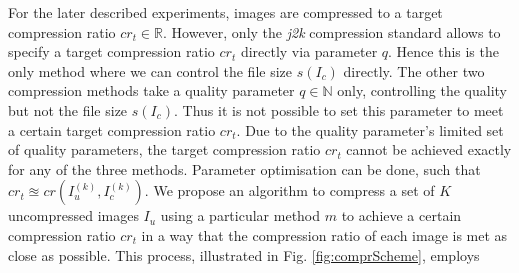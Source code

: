 \documentclass[10pt,twocolumn,letterpaper]{article}
\begin{document}
For the later described experiments, images are compressed to a target compression ratio $cr_t \in \mathbb{R}$. However, only the \emph{j2k} compression standard allows to specify a target compression ratio $cr_t$ directly via parameter $q$. Hence this is the only method where we can control the file size $s(I_c)$ directly. The other two compression methods take a quality parameter $q \in \mathbb{N}$ only, controlling the quality but not the file size $s(I_c)$. Thus it is not possible to set this parameter to meet a certain target compression ratio $cr_t$. Due to the quality parameter's limited set of quality parameters, the target compression ratio $cr_t$ cannot be achieved exactly for any of the three methods. Parameter optimisation can be done, such that $cr_t \approxeq cr(I_u^{(k)}, I_c^{(k)})$. We propose an algorithm to compress a set of $K$ uncompressed images $I_u$ using a particular method $m$ to achieve a certain compression ratio $cr_t$ in a way that the compression ratio of each image is met as close as possible. 
This process, illustrated in Fig. \ref{fig:comprScheme}, employs
\end{document}
